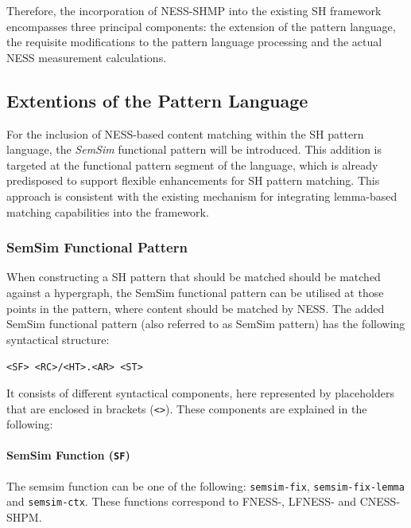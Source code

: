 \documentclass[11pt]{scrreprt}
\begin{document}
Therefore, the incorporation of NESS-SHMP into the existing SH framework encompasses three principal components: the extension of the pattern language, the requisite modifications to the pattern language processing and the actual NESS measurement calculations.



\subsection{Extentions of the Pattern Language}
For the inclusion of NESS-based content matching within the SH pattern language, the \textit{SemSim} functional pattern will be introduced. This addition is targeted at the functional pattern segment of the language, which is already predisposed to support flexible enhancements for SH pattern matching. This approach is consistent with the existing mechanism for integrating lemma-based matching capabilities into the framework.


\subsubsection{SemSim Functional Pattern}
When constructing a SH pattern that should be matched should be matched against a hypergraph, the SemSim functional pattern can be utilised at those points in the pattern, where content should be matched by NESS. The added SemSim functional pattern (also referred to as SemSim pattern) has the following syntactical structure:


\begin{center}
	\texttt{<SF> <RC>/<HT>.<AR> <ST>}\
\end{center}

It consists of different syntactical components, here represented by placeholders that are enclosed in brackets (\texttt{<>}). These components are explained in the following:

\paragraph{SemSim Function (\texttt{SF})}
 The semsim function can be one of the following: \texttt{semsim-fix}, \texttt{semsim-fix-lemma} and \texttt{semsim-ctx}. These functions correspond to FNESS-, LFNESS- and CNESS-SHPM.
 
\end{document}
